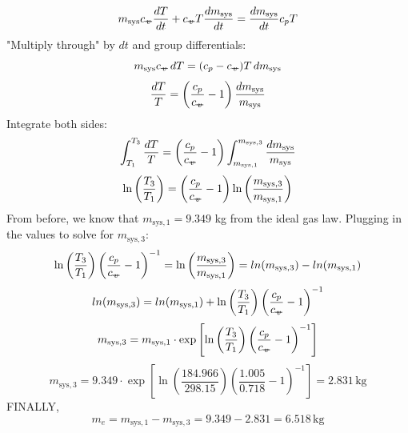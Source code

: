 \documentclass[12pt]{article}
\newcommand{\svol}{%
  \mathord{\text{\ooalign{%
    \hfil$v$\hfil\cr
    \hfil\rule[0.6ex]{0.8em}{0.5pt}\hfil
  }}}%
}
\begin{document}
\[m_\text{sys}c_{\svol} \frac{dT}{dt} + c_{\svol} T \frac{dm_\text{sys}}{dt} = \frac{dm_\text{sys}}{dt}c_p T\]
"Multiply through" by $dt$ and group differentials: 
\[m_\text{sys}c_{\svol}\,dT = (c_p-c_{\svol}) T\,dm_\text{sys}\]
\[\frac{dT}{T} = \left(\frac{c_p}{c_{\svol}} - 1\right)\frac{dm_\text{sys}}{m_\text{sys}}\]
Integrate both sides:
\[\int_{T_1}^{T_3} \frac{dT}{T} = \left(\frac{c_p}{c_{\svol}} - 1\right) \int_{m_{\text{sys},1}}^{m_{\text{sys},3}} \frac{dm_\text{sys}}{m_\text{sys}}\]
\[\ln\left(\frac{T_3}{T_1}\right) = \left(\frac{c_p}{c_{\svol}} - 1\right) \ln\left(\frac{m_{\text{sys},3}}{m_{\text{sys},1}}\right)\]
From before, we know that $m_{\text{sys},1} = 9.349$ kg from the ideal gas law. Plugging in the values to solve for $m_{\text{sys},3}$:
\[\ln\left(\frac{T_3}{T_1}\right)\left(\frac{c_p}{c_{\svol}} - 1\right)^{-1} =  \ln\left(\frac{m_{\text{sys},3}}{m_{\text{sys},1}}\right) = ln(m_{\text{sys},3}) - ln(m_{\text{sys},1})\]
\[ln(m_{\text{sys},3}) = ln(m_{\text{sys},1}) + \ln\left(\frac{T_3}{T_1}\right)\left(\frac{c_p}{c_{\svol}} - 1\right)^{-1}\]
\[m_{\text{sys},3} = m_{\text{sys},1} \cdot \exp\left[\ln\left(\frac{T_3}{T_1}\right)\left(\frac{c_p}{c_{\svol}} - 1\right)^{-1}\right]\]
\[m_{\text{sys},3} = 9.349 \cdot \exp\left[\ln\left(\frac{184.966}{298.15}\right)\left(\frac{1.005}{0.718} - 1\right)^{-1}\right] = 2.831\,\text{kg}\]
FINALLY,
\[m_e = m_{\text{sys},1} - m_{\text{sys},3} = 9.349 - 2.831 = \boxed{6.518\,\text{kg}}\]

\newpage
\end{document}
